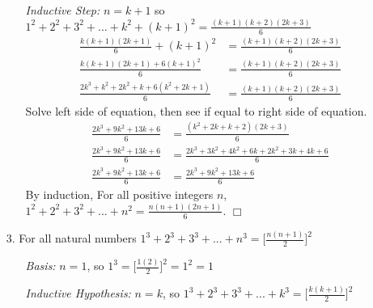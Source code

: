\documentclass{article}
\begin{document}
\begin{itemize}
\begin{itemize}
        \item[]\emph{Inductive Step:} $n=k+1$ so $1^2+2^2+3^2+...+k^2+(k+1)^2=\frac{(k+1)(k+2)(2k+3)}{6}$
        \begin{align}
            \frac{k(k+1)(2k+1)}{6}+(k+1)^2&=\frac{(k+1)(k+2)(2k+3)}{6}\nonumber\\
            \frac{k(k+1)(2k+1)+6(k+1)^2}{6}&=\frac{(k+1)(k+2)(2k+3)}{6}\nonumber\\
            \frac{2k^3+k^2+2k^2+k+6(k^2+2k+1)}{6}&=\frac{(k+1)(k+2)(2k+3)}{6}\nonumber
        \end{align}
        Solve left side of equation, then see if equal to right side of equation.
        \begin{align}
            \frac{2k^3+9k^2+13k+6}{6}&=\frac{(k^2+2k+k+2)(2k+3)}{6}\nonumber\\
            \frac{2k^3+9k^2+13k+6}{6}&=\frac{2k^3+3k^2+4k^2+6k+2k^2+3k+4k+6}{6}\nonumber\\
            \frac{2k^3+9k^2+13k+6}{6}&=\frac{2k^3+9k^2+13k+6}{6}\nonumber
        \end{align}
        By induction, For all positive integers $n$, $1^2+2^2+3^2+...+n^2=\frac{n(n+1)(2n+1)}{6}$. $\Box$
    \end{itemize}
    \newpage
    \item[3.] For all natural numbers $1^3+2^3+3^3+...+n^3=\Big[\frac{n(n+1)}{2}\Big]^2$
    \begin{itemize}
        \item[]\emph{Basis:} $n=1$, so $1^3=\Big[\frac{1(2)}{2}\Big]^2=1^2=1$
        
        \item[]\emph{Inductive Hypothesis:} $n=k$, so $1^3+2^3+3^3+...+k^3=\Big[\frac{k(k+1)}{2}\Big]^2$
        

\end{itemize}
\end{itemize}
\end{document}
